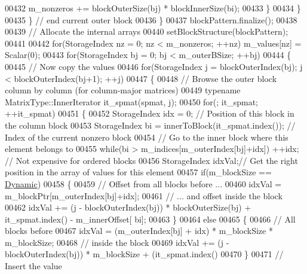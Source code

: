 \begin{DoxyCode}
00432               m\_nonzeros += blockOuterSize(bj) * blockInnerSize(bi);
00433             \}
00434           \}
00435         \} \textcolor{comment}{// end current outer block}
00436       \}
00437       blockPattern.finalize();
00438 
00439       \textcolor{comment}{// Allocate the internal arrays}
00440       setBlockStructure(blockPattern);
00441 
00442       \textcolor{keywordflow}{for}(StorageIndex nz = 0; nz < m\_nonzeros; ++nz) m\_values[nz] = Scalar(0);
00443       \textcolor{keywordflow}{for}(StorageIndex bj = 0; bj < m\_outerBSize; ++bj)
00444       \{
00445         \textcolor{comment}{// Now copy the values}
00446         \textcolor{keywordflow}{for}(StorageIndex j = blockOuterIndex(bj); j < blockOuterIndex(bj+1); ++j)
00447         \{
00448           \textcolor{comment}{// Browse the outer block column by column (for column-major matrices)}
00449           \textcolor{keyword}{typename} MatrixType::InnerIterator it\_spmat(spmat, j);
00450           \textcolor{keywordflow}{for}(; it\_spmat; ++it\_spmat)
00451           \{
00452             StorageIndex idx = 0; \textcolor{comment}{// Position of this block in the column block}
00453             StorageIndex bi = innerToBlock(it\_spmat.index()); \textcolor{comment}{// Index of the current nonzero block}
00454             \textcolor{comment}{// Go to the inner block where this element belongs to}
00455             \textcolor{keywordflow}{while}(bi > m\_indices[m\_outerIndex[bj]+idx]) ++idx; \textcolor{comment}{// Not expensive for ordered blocks}
00456             StorageIndex idxVal;\textcolor{comment}{// Get the right position in the array of values for this element}
00457             \textcolor{keywordflow}{if}(m\_blockSize == \hyperlink{namespace_eigen_ad81fa7195215a0ce30017dfac309f0b2}{Dynamic})
00458             \{
00459               \textcolor{comment}{// Offset from all blocks before ...}
00460               idxVal =  m\_blockPtr[m\_outerIndex[bj]+idx];
00461               \textcolor{comment}{// ... and offset inside the block}
00462               idxVal += (j - blockOuterIndex(bj)) * blockOuterSize(bj) + it\_spmat.index() - m\_innerOffset[
      bi];
00463             \}
00464             \textcolor{keywordflow}{else}
00465             \{
00466               \textcolor{comment}{// All blocks before}
00467               idxVal = (m\_outerIndex[bj] + idx) * m\_blockSize * m\_blockSize;
00468               \textcolor{comment}{// inside the block}
00469               idxVal += (j - blockOuterIndex(bj)) * m\_blockSize + (it\_spmat.index()%
00470             \}
00471             \textcolor{comment}{// Insert the value}

\end{DoxyCode}
